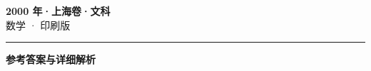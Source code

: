 \documentclass[zihao=5, a4paper]{ctexart}
\begin{document}
\begin{center}
  {\Large\bfseries 2000 年·上海卷·文科}\\[4pt]
  {\large 数学 · 印刷版}
\end{center}
\medskip
{}

\par\bigskip\hrule\bigskip
{}
\begin{center}{\large\bfseries 参考答案与详细解析}\end{center}
\smallskip

\end{document}

